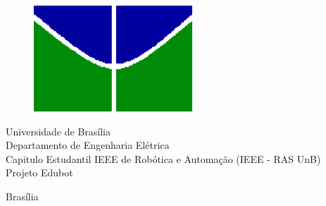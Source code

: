 \begin{figure}[h!]
    \centering
    \includegraphics[scale=0.9]{Figuras/simb_unb.png}
    \label{fig:unb}
\end{figure}

\begin{center}
    {\LARGE Universidade de Brasília}\\
    Departamento de Engenharia Elétrica\\
    Capitulo Estudantil IEEE de Robótica e Automação (IEEE - RAS UnB)\\
    Projeto Edubot\\
    
    \vfill
    
    \Huge \bf \thetitle
    
    \vfill
    
    \large \normalsize                             %
    
    Brasília \\
    \the\year %
    
    \thispagestyle{empty} %
\end{center}
\newpage
\tableofcontents
\newpage

